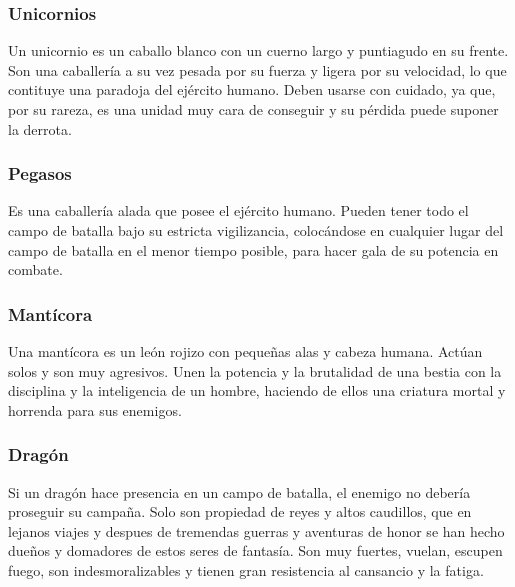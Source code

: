 \subsubsection*{Unicornios}
Un unicornio es un caballo blanco con un cuerno largo y puntiagudo en
su frente. Son una caballería a su vez pesada por su fuerza y ligera por su velocidad,
lo que contituye una paradoja del ejército humano. Deben usarse con
cuidado, ya que, por su rareza, es una unidad muy cara de conseguir y
su pérdida puede suponer la derrota.


\subsubsection*{Pegasos}
Es una caballería alada que posee el ejército humano. Pueden tener
todo el campo de batalla bajo su estricta vigilizancia, colocándose en
cualquier lugar del campo de batalla en el menor tiempo posible, para
hacer gala de su potencia en combate.


\subsubsection*{Mantícora}
Una mantícora es un león rojizo con pequeñas alas y cabeza humana. Actúan solos
y son muy agresivos. Unen la potencia y la brutalidad de una bestia con
la disciplina y la inteligencia de un hombre, haciendo de ellos una
criatura mortal y horrenda para sus enemigos.


\subsubsection*{Dragón}
Si un dragón hace presencia en un campo de batalla, el enemigo no
debería proseguir su campaña. Solo son propiedad de reyes y altos
caudillos, que en lejanos viajes y despues de tremendas guerras y
aventuras de honor se han hecho dueños y domadores de estos seres de
fantasía. Son muy fuertes, vuelan, escupen fuego, son
indesmoralizables y tienen gran resistencia al cansancio y la fatiga.


